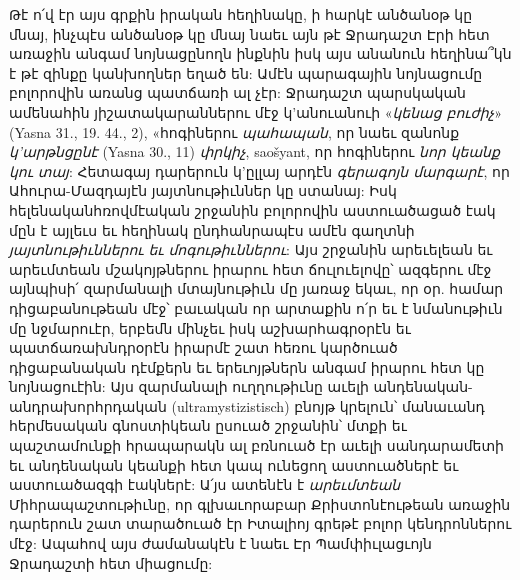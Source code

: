 \documentclass{article}
\begin{document}
{Թէ ո՛վ էր այս գրքին իրական հեղինակը, ի հարկէ անծանօթ կը մնայ, ինչպէս անծանօթ կը մնայ նաեւ այն թէ Ջրադաշտ Էրի հետ առաջին անգամ նոյնացընողն ինքնին իսկ այս անանուն հեղինա՞կն է թէ զինքը կանխողներ եղած են: Ամէն պարագային նոյնացումը բոլորովին առանց պատճառի ալ չէր: Ջրադաշտ պարսկական ամենահին յիշատակարաններու մէջ կ'անուանուի «\emph{կենաց բուժիչ}» (Yasna 31., 19. 44., 2), «հոգիներու \emph{պահապան}, որ նաեւ զանոնք \emph{կ'արթնցընէ} (Yasna 30., 11) \emph{փրկիչ}, saošyant, որ հոգիներու \emph{նոր կեանք կու տայ}: Հետագայ դարերուն կ'ըլլայ արդէն \emph{գերագոյն մարգարէ}, որ Ահուրա-Մազդայէն յայտնութիւններ կը ստանայ: Իսկ հելենականհռովմէական շրջանին բոլորովին աստուածացած էակ մըն է այլեւս եւ հեղինակ ընդհանրապէս ամէն գաղտնի \emph{յայտնութիւններու եւ մոգութիւններու}: Այս շրջանին արեւելեան եւ արեւմտեան մշակոյթներու իրարու հետ ճուլուելովը՝ ազգերու մէջ այնպիսի՛ զարմանալի մտայնութիւն մը յառաջ եկաւ, որ օր. համար դիցաբանութեան մէջ՝ բաւական որ արտաքին ո՛ր եւ է նմանութիւն մը նջմարուէր, երբեմն մինչեւ իսկ աշխարհագրօրէն եւ պատճառախնդրօրէն իրարմէ շատ հեռու կարծուած դիցաբանական դէմքերն եւ երեւոյթներն անգամ իրարու հետ կը նոյնացուէին: Այս զարմանալի ուղղութիւնը աւելի անդենական-անդրախորհրդական (ultramystizistisch) բնոյթ կրելուն՝ մանաւանդ հերմեսական գնոստիկեան ըսուած շրջանին՝ մտքի եւ պաշտամունքի հրապարակն ալ բռնուած էր աւելի սանդարամետի եւ անդենական կեանքի հետ կապ ունեցող աստուածներէ եւ աստուածազգի էակներէ: Ա՛յս ատենէն է \emph{արեւմտեան} Միհրապաշտութիւնը, որ գլխաւորաբար Քրիստոնէութեան առաջին դարերուն շատ տարածուած էր Իտալիոյ գրեթէ բոլոր կենդրոններու մէջ: Ապահով այս ժամանակէն է նաեւ Էր Պամփիւլացւոյն Ջրադաշտի հետ միացումը:

}
\end{document}
